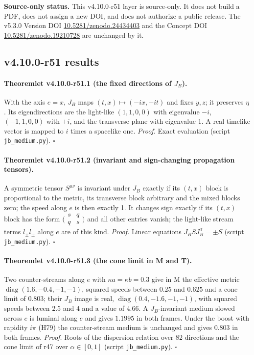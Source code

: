 \noindent\textbf{Source-only status.}
This v4.10.0-r51 layer is source-only.  It does not build a PDF, does not assign a new DOI,
and does not authorize a public release.  The v5.3.0 Version DOI
\href{https://doi.org/10.5281/zenodo.24434403}{10.5281/zenodo.24434403} and the Concept DOI
\href{https://doi.org/10.5281/zenodo.19210728}{10.5281/zenodo.19210728} are unchanged by it.

\subsection*{v4.10.0-r51 results}
\label{subsec:v4100-r51-results}

\paragraph{Theoremlet v4.10.0-r51.1 (the fixed directions of \(J_B\)).}
With the axis \(e=x\), \(J_B\) maps \((t,x)\mapsto(-ix,-it)\) and fixes \(y,z\); it preserves \(\eta\).  Its eigendirections are the light-like \((1,1,0,0)\) with eigenvalue \(-i\), \((-1,1,0,0)\)
with \(+i\), and the transverse plane with eigenvalue 1.  A real timelike vector is mapped to \(i\) times a spacelike one.
\emph{Proof.} Exact evaluation (script \texttt{jb\_\allowbreak medium.py}).  \(\square\)

\paragraph{Theoremlet v4.10.0-r51.2 (invariant and sign-changing propagation tensors).}
A symmetric tensor \(S^{\mu\nu}\) is invariant under \(J_B\) exactly if its \((t,x)\) block is proportional to the metric, its transverse block arbitrary and the mixed blocks
zero; the speed along \(e\) is then exactly 1.  It changes sign exactly if its \((t,x)\) block has the form \(\bigl(\begin{smallmatrix}s&q\\q&s\end{smallmatrix}\bigr)\) and all other entries vanish; the light-like
stream terms \(l_\pm l_\pm\) along \(e\) are of this kind.
\emph{Proof.} Linear equations \(J_BSJ_B^{\mathsf T}=\pm S\) (script \texttt{jb\_\allowbreak medium.py}).  \(\square\)

\paragraph{Theoremlet v4.10.0-r51.3 (the cone limit in M and T).}
Two counter-streams along \(e\) with \(\kappa a=\kappa b=0.3\) give in M the effective metric \(\operatorname{diag}(1.6,-0.4,-1,-1)\), squared speeds between \(0.25\) and \(0.625\) and a cone limit of
\(0.803\); their \(J_B\) image is real, \(\operatorname{diag}(0.4,-1.6,-1,-1)\), with squared speeds between \(2.5\) and \(4\) and a value of \(4.66\).  A \(J_B\)-invariant medium slowed across \(e\) is luminal along \(e\)
and gives \(1.1995\) in both frames.  Under the boost with rapidity \(i\pi\) (H79) the counter-stream medium is unchanged and gives \(0.803\) in both frames.
\emph{Proof.} Roots of the dispersion relation over 82 directions and the cone limit of r47 over \(\alpha\in[0,1]\) (script \texttt{jb\_\allowbreak medium.py}).  \(\square\)

